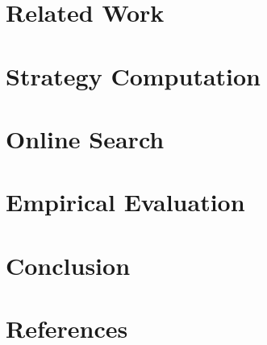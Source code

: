 \documentclass[preprint,12pt]{elsarticle}
\newcommand{\reviewchange}[1]{{\color{blue}#1}}
\begin{document}
 

\section{Related Work} \label{sec:relwork}



\section{Strategy Computation} \label{sec:offline}

 

\section{Online Search} \label{sec:online}




\section{Empirical Evaluation} \label{sec:eval}



\section{Conclusion} \label{sec:conc}



\section*{References}










\end{document}
